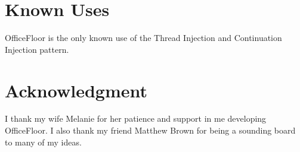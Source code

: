 \documentclass{article}
\begin{document}
\section{Known Uses}

OfficeFloor \cite{officefloor} is the only known use of the Thread Injection and
Continuation Injection pattern.


\section*{Acknowledgment} I thank my wife Melanie for her patience and support
in me developing OfficeFloor.  I also thank my friend Matthew Brown for being a
sounding board to many of my ideas.




\end{document}
